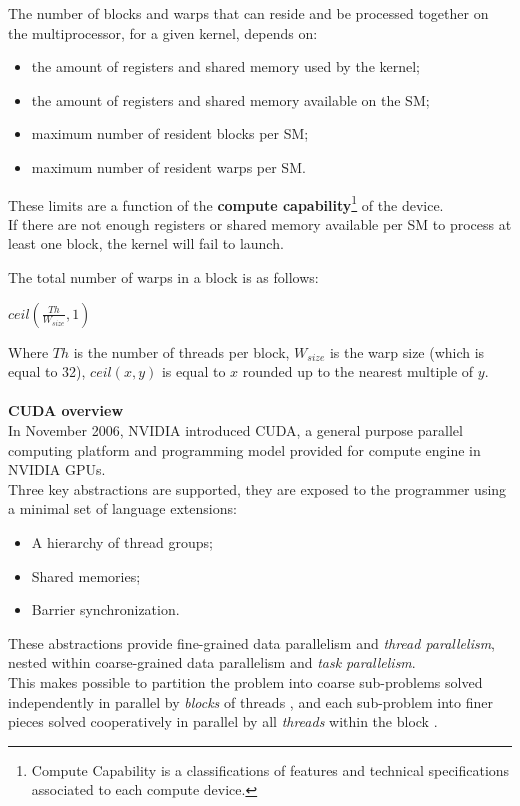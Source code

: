 	The number of blocks and warps that can reside and be processed together on the multiprocessor, for a given kernel, depends on:
	\begin{itemize}
		\item the amount of registers and shared memory used by the kernel;
		\item the amount of registers and shared memory available on the SM;
		\item maximum number of resident blocks per SM;
		\item maximum number of resident warps per SM.
	\end{itemize}
	These limits are a function of the \textbf{compute capability}\footnote{Compute Capability is a classifications of features and technical specifications associated to each compute device.} of the device.\\
	If there are not enough registers or shared memory available per SM to process at least one block, the kernel will fail to launch.
	
	The total number of warps in a block is as follows:
	\begin{center}
		\(ceil ( \frac{Th}{W_{size}}, 1 )\)
	\end{center}
	Where \(Th\) is the number of threads per block, \(W_{size}\) is the warp size (which is equal to 32), \(ceil (x, y)\) is equal to \(x\) rounded up to the nearest multiple of \(y\)\cite{cudaguide}.\\\\
	\textbf{\large{CUDA overview}}\\
	In November 2006, NVIDIA introduced CUDA, a general purpose parallel computing platform and programming model provided for compute engine in NVIDIA GPUs.\\%
	Three key abstractions are supported, they are exposed to the programmer using a minimal
	set of language extensions:
	\begin{itemize}
		\item A hierarchy of thread groups;
		
		\item Shared memories;
		
		\item Barrier synchronization.
	\end{itemize} 
	
	These abstractions provide fine-grained data parallelism and \textit{thread parallelism}, nested within coarse-grained data parallelism and \textit{task parallelism}.\\
	This makes possible to partition the problem into coarse sub-problems \textendash solved independently in parallel by \textit{blocks} of threads \textendash, and each sub-problem into finer pieces \textendash solved cooperatively in parallel by all \textit{threads} within the block \textendash.
	
